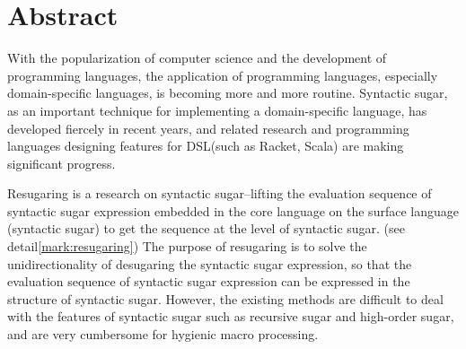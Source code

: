 \documentclass[UTF8,openany,AutoFakeBold,AutoFakeSlant,cs4size]{ctexbook}
\begin{document}

\bigskip
{}


{
	\fancyhf{} %



	\fancyfoot[CO,CE]{~\thepage~}

	\renewcommand{\headrulewidth}{0.7pt} %

	\renewcommand{\footrulewidth}{0pt} %
}

\fancyhf{}
\fancyfoot[CO,CE]{~\thepage~}
\renewcommand{\headrulewidth}{0.7pt}
\renewcommand{\footrulewidth}{0pt}
\clearpage






\small
\linespread{1.5}\selectfont

\chapter*{\bfseries Abstract}
{} %
With the popularization of computer science and the development of programming languages, the application of programming languages, especially domain-specific languages, is becoming more and more routine. Syntactic sugar, as an important technique for implementing a domain-specific language, has developed fiercely in recent years, and related research and programming languages designing features for DSL(such as Racket, Scala) are making significant progress.

Resugaring is a research on syntactic sugar--lifting the evaluation sequence of syntactic sugar expression embedded in the core language on the surface language (syntactic sugar) to get the sequence at the level of syntactic sugar. (see detail\ref{mark:resugaring}) The purpose of resugaring is to solve the unidirectionality of desugaring the syntactic sugar expression, so that the evaluation sequence of syntactic sugar expression can be expressed in the structure of syntactic sugar. However, the existing methods are difficult to deal with the features of syntactic sugar such as recursive sugar and high-order sugar, and are very cumbersome for hygienic macro processing.
\end{document}
